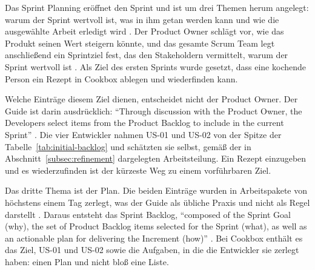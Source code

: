 %
%
%
Das Sprint Planning eröffnet den Sprint und ist um drei Themen herum angelegt:
warum der Sprint wertvoll ist, was in ihm getan werden kann und wie die
ausgewählte Arbeit erledigt wird \parencite[p.~8]{scrumguide2020}. Der Product
Owner schlägt vor, wie das Produkt seinen Wert steigern könnte, und das gesamte
Scrum Team legt anschließend ein Sprintziel fest, das den Stakeholdern vermittelt,
warum der Sprint wertvoll ist \parencite[p.~8]{scrumguide2020}. Als Ziel des ersten Sprints wurde gesetzt,
dass eine kochende Person ein Rezept in Cookbox ablegen und wiederfinden kann.

Welche Einträge diesem Ziel dienen, entscheidet nicht der Product Owner. Der
Guide ist darin ausdrücklich: \enquote{Through discussion with the Product Owner, the Developers
select items from the Product Backlog to include in the current Sprint}
\parencite[p.~8]{scrumguide2020}. Die vier Entwickler nahmen US-01 und US-02 von
der Spitze der Tabelle~\ref{tab:initial-backlog} und schätzten sie selbst, gemäß
der in Abschnitt~\ref{subsec:refinement} dargelegten Arbeitsteilung. Ein Rezept
einzugeben und es wiederzufinden ist der kürzeste Weg zu einem vorführbaren
Ziel.

Das dritte Thema ist der Plan. Die beiden Einträge wurden in Arbeitspakete von
höchstens einem Tag zerlegt, was der Guide als übliche Praxis und nicht als Regel
darstellt \parencite[p.~8]{scrumguide2020}. Daraus entsteht das Sprint Backlog,
\enquote{composed of the Sprint Goal (why), the set of Product Backlog items
selected for the Sprint (what), as well as an actionable plan for delivering the
Increment (how)} \parencite[p.~11]{scrumguide2020}. Bei Cookbox enthält es das
Ziel, US-01 und US-02 sowie die Aufgaben, in die die Entwickler sie zerlegt
haben: einen Plan und nicht bloß eine Liste.

